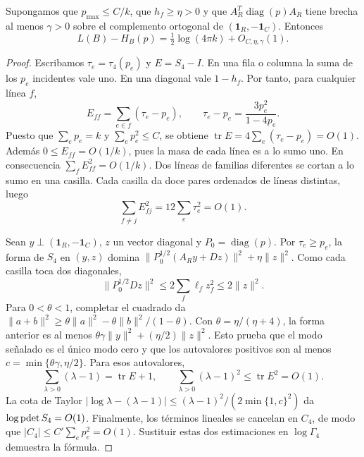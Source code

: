 \begin{lema}\label{coste-estatico}
Supongamos que $p_{\max}\le C/k$, que $h_f\ge\eta>0$ y que
$A_R^T\operatorname{diag}(p)A_R$ tiene brecha al menos $\gamma>0$ sobre el complemento ortogonal de
$(\mathbf1_R,-\mathbf1_C)$. Entonces
\[
 L(B)-H_B(p)=\tfrac12\log(4\pi k)+O_{C,\eta,\gamma}(1).
\]
\end{lema}
\begin{proof}
Escribamos $\tau_e=\tau_4(p_e)$ y $E=S_4-I$. En una fila o columna la suma de los $p_e$ incidentes
vale uno. En una diagonal vale $1-h_f$. Por tanto, para cualquier línea $f$,
\[
 E_{ff}=\sum_{e\in f}(\tau_e-p_e),\qquad
 \tau_e-p_e=\frac{3p_e^2}{1-4p_e}.
\]
Puesto que $\sum_e p_e=k$ y $\sum_e p_e^2\le C$, se obtiene
$\operatorname{tr}E=4\sum_e(\tau_e-p_e)=O(1)$. Además $0\le E_{ff}=O(1/k)$, pues la masa de cada línea
es a lo sumo uno. En consecuencia $\sum_f E_{ff}^2=O(1/k)$. Dos líneas de familias diferentes se
cortan a lo sumo en una casilla. Cada casilla da doce pares ordenados de líneas distintas, luego
\[
 \sum_{f\ne j}E_{fj}^2=12\sum_e\tau_e^2=O(1).
\]

Sean $y\perp(\mathbf1_R,-\mathbf1_C)$, $z$ un vector diagonal y $P_0=\operatorname{diag}(p)$. Por
$\tau_e\ge p_e$, la forma de $S_4$ en $(y,z)$ domina
$\|P_0^{1/2}(A_Ry+Dz)\|^2+\eta\|z\|^2$. Como cada casilla toca dos diagonales,
\[
 \|P_0^{1/2}Dz\|^2
 \le2\sum_f\ell_f z_f^2\le2\|z\|^2.
\]
Para $0<\theta<1$, completar el cuadrado da
$\|a+b\|^2\ge\theta\|a\|^2-\theta\|b\|^2/(1-\theta)$. Con $\theta=\eta/(\eta+4)$, la forma anterior es
al menos
$\theta\gamma\|y\|^2+(\eta/2)\|z\|^2$.
Esto prueba que el modo señalado es el único modo cero y que los autovalores positivos son al menos
$c=\min\{\theta\gamma,\eta/2\}$. Para esos autovalores,
\[
 \sum_{\lambda>0}(\lambda-1)=\operatorname{tr}E+1,\qquad
 \sum_{\lambda>0}(\lambda-1)^2\le\operatorname{tr}E^2=O(1).
\]
La cota de Taylor $|\log\lambda-(\lambda-1)|\le
(\lambda-1)^2/(2\min\{1,c\}^2)$ da $\log\operatorname{pdet} S_4=O(1)$.
Finalmente, los términos lineales se cancelan en $C_4$, de modo que $|C_4|\le C'\sum_e p_e^2=O(1)$.
Sustituir estas dos estimaciones en $\log\Gamma_4$ demuestra la fórmula.
\end{proof}
